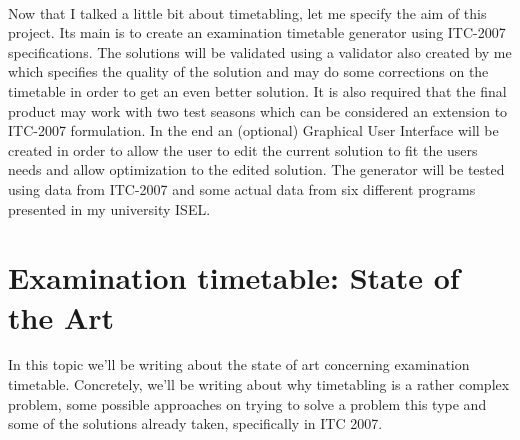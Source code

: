 \\
Now that I talked a little bit about timetabling, let me specify the aim of this project. Its main is to create an examination timetable generator using ITC-2007 specifications. The solutions will be validated using a validator also created by me which specifies the quality of the solution and may do some corrections on the timetable in order to get an even better solution. It is also required that the final product may work with two test seasons which can be considered an extension to ITC-2007 formulation. In the end an (optional) Graphical User Interface will be created in order to allow the user to edit the current solution to fit the users needs and allow optimization to the edited solution. The generator will be tested using data from ITC-2007 and some actual data from six different programs presented in my university ISEL.\\
\section{Examination timetable: State of the Art}
\label{sec:sota}
In this topic we'll be writing about the state of art concerning examination timetable. Concretely, we'll be writing about why timetabling is a rather complex problem, some possible approaches on trying to solve a problem this type and some of the solutions already taken, specifically in ITC 2007.
